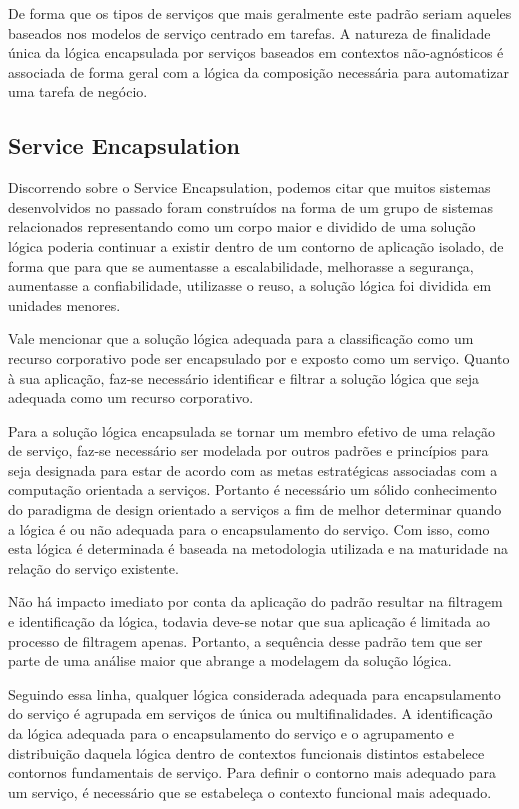 \documentclass[12pt]{article}
\begin{document}
De forma que os tipos de serviços que mais geralmente este padrão seriam aqueles baseados nos modelos de serviço centrado em tarefas. A natureza de finalidade única da lógica encapsulada por serviços baseados em contextos não-agnósticos é associada de forma geral com a lógica da composição necessária para automatizar uma tarefa de negócio.

\subsection{Service Encapsulation}

Discorrendo sobre o Service Encapsulation, podemos citar que muitos sistemas desenvolvidos no passado foram construídos na forma de um grupo de sistemas relacionados representando como um corpo maior e dividido de uma solução lógica poderia continuar a existir dentro de um contorno de aplicação isolado, de forma que para que se aumentasse a escalabilidade, melhorasse a segurança, aumentasse a confiabilidade, utilizasse o reuso, a solução lógica foi dividida em unidades menores.

Vale mencionar que a solução lógica adequada para a classificação como um recurso corporativo pode ser encapsulado por e exposto como um serviço. Quanto à sua aplicação, faz-se necessário identificar e filtrar a solução lógica que seja adequada como um recurso corporativo.

Para a solução lógica encapsulada se tornar um membro efetivo de uma relação de serviço, faz-se necessário ser modelada por outros padrões e princípios para seja designada para estar de acordo com as metas estratégicas associadas com a computação orientada a serviços. Portanto é necessário um sólido conhecimento do paradigma de design orientado a serviços a fim de melhor determinar quando a lógica é ou não adequada para o encapsulamento do serviço. Com isso, como esta lógica é determinada é baseada na metodologia utilizada e na maturidade na relação do serviço existente.

Não há impacto imediato por conta da aplicação do padrão resultar na filtragem e identificação da lógica, todavia deve-se notar que sua aplicação é limitada ao processo de filtragem apenas. Portanto, a sequência desse padrão tem que ser parte de uma análise maior que abrange a modelagem da solução lógica.

Seguindo essa linha, qualquer lógica considerada adequada para encapsulamento do serviço é agrupada em serviços de única ou multifinalidades. A identificação da lógica adequada para o encapsulamento do serviço e o agrupamento e distribuição daquela lógica dentro de contextos funcionais distintos estabelece contornos fundamentais de serviço. Para definir o contorno mais adequado para um serviço, é necessário que se estabeleça o contexto funcional mais adequado.
\end{document}
